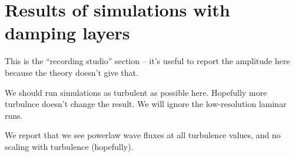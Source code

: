 \section{Results of simulations with damping layers}
\label{sec:results_damping}

This is the ``recording studio'' section -- it's useful to report the amplitude here because the theory doesn't give that.

We should run simulations as turbulent as possible here.
Hopefully more turbulnce doesn't change the result.
We will ignore the low-resolution laminar runs.

We report that we see powerlaw wave fluxes at all turbulence values, and no scaling with turbulence (hopefully).



